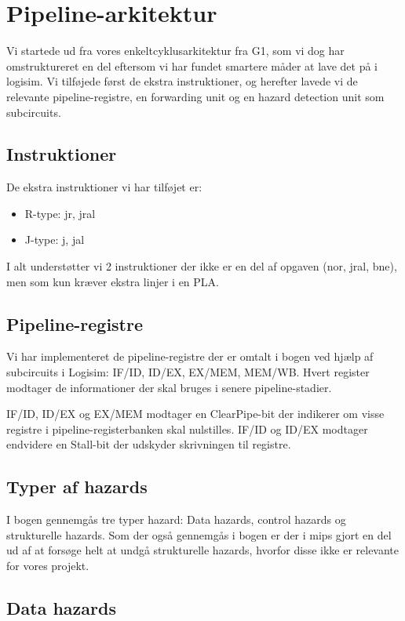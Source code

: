 \section{Pipeline-arkitektur}

Vi startede ud fra vores enkeltcyklusarkitektur fra G1, som vi dog har omstruktureret en del
eftersom vi har fundet smartere måder at lave det på i logisim. Vi tilføjede først de ekstra
instruktioner, og herefter lavede vi de relevante pipeline-registre, en forwarding unit og 
en hazard detection unit som subcircuits.  

\subsection{Instruktioner}
De ekstra instruktioner vi har tilføjet er:
\begin{itemize}
\item R-type: jr, jral
\item J-type: j, jal
\end{itemize}

I alt understøtter vi 2 instruktioner der ikke er en del af opgaven (nor, jral, bne), men som kun kræver ekstra
linjer i en PLA. 

\subsection{Pipeline-registre}

Vi har implementeret de pipeline-registre der er omtalt i bogen ved hjælp af
subcircuits i Logisim: IF/ID, ID/EX, EX/MEM, MEM/WB. Hvert register modtager
de informationer der skal bruges i senere pipeline-stadier.

IF/ID, ID/EX og EX/MEM modtager en ClearPipe-bit der indikerer om visse
registre i pipeline-registerbanken skal nulstilles. IF/ID og ID/EX modtager
endvidere en Stall-bit der udskyder skrivningen til registre.

\subsection{Typer af hazards}
I bogen gennemgås tre typer hazard: Data hazards, control hazards og
strukturelle hazards. Som der også gennemgås i bogen er der i mips gjort en del
ud af at forsøge helt at undgå strukturelle hazards, hvorfor disse ikke er
relevante for vores projekt.

\subsection{Data hazards}
